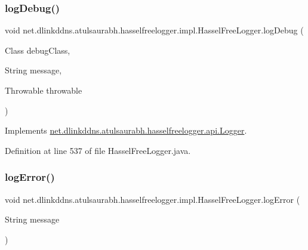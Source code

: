 \subsubsection{\texorpdfstring{log\+Debug()}{logDebug()}\hspace{0.1cm}{\footnotesize\ttfamily [3/3]}}
{\footnotesize\ttfamily void net.\+dlinkddns.\+atulsaurabh.\+hasselfreelogger.\+impl.\+Hassel\+Free\+Logger.\+log\+Debug (\begin{DoxyParamCaption}\item[{Class}]{debug\+Class,  }\item[{String}]{message,  }\item[{Throwable}]{throwable }\end{DoxyParamCaption})}



Implements \mbox{\hyperlink{interfacenet_1_1dlinkddns_1_1atulsaurabh_1_1hasselfreelogger_1_1api_1_1_logger_aff388bb623493721b9aac70ef39492ec}{net.\+dlinkddns.\+atulsaurabh.\+hasselfreelogger.\+api.\+Logger}}.



Definition at line 537 of file Hassel\+Free\+Logger.\+java.

\mbox{\label{classnet_1_1dlinkddns_1_1atulsaurabh_1_1hasselfreelogger_1_1impl_1_1_hassel_free_logger_a94641af9c6c39ea601d5c41bf68a4b1f}} 
\subsubsection{\texorpdfstring{log\+Error()}{logError()}\hspace{0.1cm}{\footnotesize\ttfamily [1/3]}}
{\footnotesize\ttfamily void net.\+dlinkddns.\+atulsaurabh.\+hasselfreelogger.\+impl.\+Hassel\+Free\+Logger.\+log\+Error (\begin{DoxyParamCaption}\item[{String}]{message }\end{DoxyParamCaption})}



